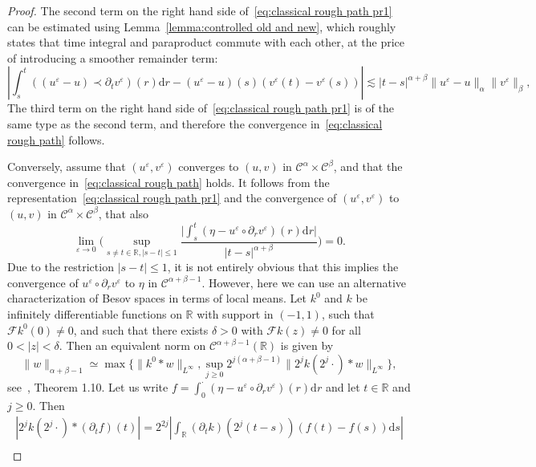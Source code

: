 \documentclass[11pt,a4paper]{article}
\newcommand{\cdummy}{\cdot}
\newcommand{\mathd}{\mathrm{d}}
\theoremstyle{remark}
\newcommand{\CC}{\ensuremath{\mathscr{C}}}
\begin{document}
\begin{proof}
  The second term on the right hand side of~{\eqref{eq:classical rough path pr1}} can be estimated using Lemma~\ref{lemma:controlled old and new}, which roughly states that time integral and paraproduct commute with each other, at the price of introducing a smoother remainder term:
  \[
     \left| \int_{s}^{t} ( ( u^{\varepsilon} -u ) \prec \partial_{t} v^{\varepsilon} ) ( r ) \mathd r- ( u^{\varepsilon} -u ) ( s ) ( v^{\varepsilon} ( t ) -v^{\varepsilon} ( s ) ) \right| \lesssim | t-s |^{\alpha + \beta} \| u^{\varepsilon} -u \|_{\alpha} \| v^{\varepsilon} \|_{\beta},
  \]
  The third term on the right hand side of~{\eqref{eq:classical rough path pr1}} is of the same type as the second term, and therefore the convergence
  in~{\eqref{eq:classical rough path}} follows.
  
  Conversely, assume that $( u^{\varepsilon} ,v^{\varepsilon} )$ converges to
  $( u,v )$ in $\CC^{\alpha} \times \CC^\beta$, and that the
  convergence in~{\eqref{eq:classical rough path}} holds. It follows from the
  representation~{\eqref{eq:classical rough path pr1}} and the
  convergence of $( u^{\varepsilon} ,v^{\varepsilon} )$ to $( u,v )$ in
  $\CC^{\alpha} \times \CC^\beta$, that also
  \[
     \lim_{\varepsilon \rightarrow 0} \Bigg( \sup_{s \neq t \in \mathbb{R}, | s-t | \leqslant 1} \frac{\big| \int_{s}^{t} ( \eta -u^{\varepsilon} \circ \partial_{r} v^{\varepsilon} ) ( r ) \mathd r \big|}{| t-s |^{\alpha + \beta}} \Bigg) =0.
  \]
  Due to the restriction $| s-t | \leqslant 1$, it is not entirely obvious
  that this implies the convergence of $u^{\varepsilon} \circ \partial_{r} v^{\varepsilon}$ to $\eta$ in $\CC^{\alpha + \beta -1}$. However, here
  we can use an alternative characterization of Besov spaces in terms of
  local means. Let $k^{0}$ and $k$ be infinitely differentiable functions on
  $\mathbb{R}$ with support in $( -1,1 )$, such that $\mathcal{F}k^{0} (0 ) \neq 0$, and such that there exists $\delta >0$ with $\mathcal{F}k ( z ) \neq 0$ for all $0< | z | < \delta$. Then an equivalent norm on $\CC^{\alpha + \beta -1} ( \mathbb{R} )$ is given by
  \[
     \| w \|_{\alpha + \beta -1} \simeq \max \Big\{ \| k^{0} \ast w \|_{L^{\infty}} , \sup_{j \geqslant 0}  2^{j ( \alpha + \beta -1 )} \| 2^{j} k ( 2^{j}  \cdummy ) \ast w \|_{L^{\infty}} \Big\} ,
  \]
  see~\cite{Triebel2006}, Theorem 1.10. Let us write $f= \int_{0}^{\cdummy} (\eta -u^{\varepsilon} \circ \partial_{r} v^{\varepsilon} ) ( r ) \mathd r$
  and let $t \in \mathbb{R}$ and $j \geqslant 0$. Then
  \begin{gather*}
     | 2^{j} k ( 2^{j} \cdummy ) \ast (\partial_t f) ( t ) | = 2^{2j} \left| \int_{\mathbb{R}} (\partial_{t} k) (2^j (t-s) ) ( f ( t ) -f ( s ) ) \mathd s \right| \\

\end{gather*}
\end{proof}
\end{document}
